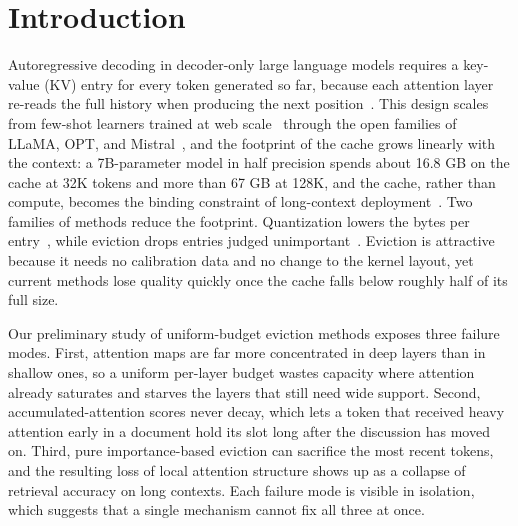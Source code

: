 \section{Introduction}\label{sec:intro}

Autoregressive decoding in decoder-only large language models requires a
key-value (KV) entry for every token generated so far, because each
attention layer re-reads the full history when producing the next
position~\cite{shazeer2019fast,vaswani2017attention}. This design
scales from few-shot learners trained at web scale~\cite{brown2020language}
through the open families of LLaMA, OPT, and
Mistral~\cite{touvron2023llama,touvron2023llama2,zhang2022opt,jiang2023mistral},
and the footprint of the cache grows linearly with the context: a
7B-parameter model in half precision spends about 16.8 GB on the cache
at 32K tokens and more than 67 GB at 128K, and the cache, rather than
compute, becomes the binding constraint of long-context
deployment~\cite{pope2023efficiently,kwon2023vllm}. Two families of
methods reduce the footprint. Quantization lowers the bytes per
entry~\cite{dettmers2022llmint8,liu2024kivi,hooper2024kvquant}, while
eviction drops entries judged unimportant~\cite{zhang2023h2o,
liu2023scissorhands,xiao2023efficient,oren2024tova}. Eviction is
attractive because it needs no calibration data and no change to the
kernel layout, yet current methods lose quality quickly once the cache
falls below roughly half of its full size.

Our preliminary study of uniform-budget eviction methods exposes three
failure modes. First, attention maps are far more concentrated in deep
layers than in shallow ones, so a uniform per-layer budget wastes
capacity where attention already saturates and starves the layers that
still need wide support. Second, accumulated-attention scores never
decay, which lets a token that received heavy attention early in a
document hold its slot long after the discussion has moved on. Third,
pure importance-based eviction can sacrifice the most recent tokens,
and the resulting loss of local attention structure shows up as a
collapse of retrieval accuracy on long contexts. Each failure mode is
visible in isolation, which suggests that a single mechanism cannot fix
all three at once.

